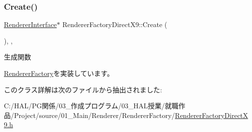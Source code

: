 \subsubsection{\texorpdfstring{Create()}{Create()}}
{\footnotesize\ttfamily \mbox{\hyperlink{class_renderer_interface}{Renderer\+Interface}}$\ast$ Renderer\+Factory\+Direct\+X9\+::\+Create (\begin{DoxyParamCaption}{ }\end{DoxyParamCaption})\hspace{0.3cm}{\ttfamily [inline]}, {\ttfamily [override]}, {\ttfamily [virtual]}}



生成関数 



\mbox{\hyperlink{class_renderer_factory_a1907fb4787bf1abdf48443c1e87c0f13}{Renderer\+Factory}}を実装しています。



このクラス詳解は次のファイルから抽出されました\+:\begin{DoxyCompactItemize}
\item 
C\+:/\+H\+A\+L/\+P\+G関係/03\+\_\+作成プログラム/03\+\_\+\+H\+A\+L授業/就職作品/\+Project/source/01\+\_\+\+Main/\+Renderer/\+Renderer\+Factory/\mbox{\hyperlink{_renderer_factory_direct_x9_8h}{Renderer\+Factory\+Direct\+X9.\+h}}\end{DoxyCompactItemize}
